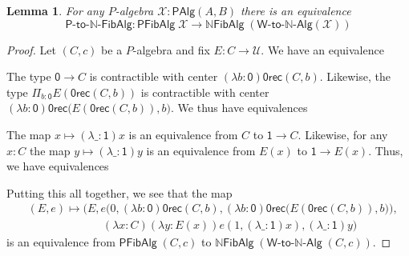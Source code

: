 \documentclass[reqno,10pt,a4paper,oneside]{amsart}
\numberwithin{equation}{section}
\theoremstyle{mythm}
\newtheorem{lemma}[theorem]{Lemma}
\theoremstyle{mydef}
\theoremstyle{myrmk}
\newcommand{\U}{\mathcal{U}}
\newcommand{\prd}[1]{\Pi_{#1}}
\newcommand{\abort}{\mathsf{0rec}}
\newcommand{\nat}{\ensuremath{\mathbb{N}}}
\newcommand{\W}{\mathsf{W}}
\newcommand{\Bool}{\mathsf{Bool}}
\newcommand{\one}{\mathsf{1}}
\newcommand{\zero}{\mathsf{0}}
\newcommand{\NatFibAlg}{\nat\mathsf{FibAlg}}
\newcommand{\WAlgToNatAlg}{\W\text{-}\mathsf{to}\text{-}\nat\text{-}\mathsf{Alg}}
\newcommand{\WFibAlgToNatFibAlg}{\mathsf{P}\text{-}\mathsf{to}\text{-}\nat\text{-}\mathsf{FibAlg}}
\newcommand{\WAlg}{\mathsf{PAlg}}
\newcommand{\WFibAlg}{\mathsf{PFibAlg}}
\newcommand{\X}{\mathcal{X}}
\begin{document}
\begin{lemma}
For any $P$-algebra $\X : \WAlg(A,B)$ there is an equivalence
\[ \WFibAlgToNatFibAlg : \WFibAlg \; \X \to \NatFibAlg \; (\WAlgToNatAlg(\X)) \]
\end{lemma}
\begin{proof}
Let $(C,c)$ be a $P$-algebra and fix $E : C \to \U$. We have an equivalence
\begin{center}
\end{center}
The type $\zero \to C$ is contractible with center $(\lambda b:\zero) \abort(C,b)$. Likewise, the type $\prd{b:\zero} E(\abort(C,b))$ is contractible with center 
$(\lambda b:\zero) \abort\big(E(\abort(C,b)),b\big)$. We thus have equivalences
\begin{center}
\end{center}
The map $x \mapsto (\lambda \_:\one)x$ is an equivalence from $C$ to $\one \to C$. Likewise, for any $x:C$ the map $y \mapsto (\lambda \_:\one)y$  is an equivalence from $E(x)$ to $\one \to E(x)$. Thus, we have equivalences
\begin{center}
\end{center}
Putting this all together, we see that the map 
\begin{align*}
& (E,e) \mapsto \Big(E,e\big(0,(\lambda b:\zero) \abort(C,b), (\lambda b:\zero) \abort\big(E(\abort(C,b)),b\big)\big),\\ & \;\;\;\;\;\;\;\;\;\;\;\;\;\;\;\;\;\;\;\;\;\;\;\; (\lambda x:C) (\lambda y:E(x)) e(1, (\lambda \_:\one)x), (\lambda \_:\one)y\Big)
\end{align*}
is an equivalence from $\WFibAlg \; (C,c)$ to $\NatFibAlg \; (\WAlgToNatAlg \; (C,c))$.
\end{proof}
\end{document}

